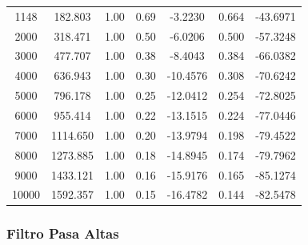 \documentclass{article}
\begin{document}
\begin{table}[H]
\begin{tabular}{ccccccc}
1148  & 182.803  & 1.00 & 0.69 &  -3.2230 & 0.664 & -43.6971 \\
2000  & 318.471  & 1.00 & 0.50 &  -6.0206 & 0.500 & -57.3248 \\
3000  & 477.707  & 1.00 & 0.38 &  -8.4043 & 0.384 & -66.0382 \\
4000  & 636.943  & 1.00 & 0.30 & -10.4576 & 0.308 & -70.6242 \\
5000  & 796.178  & 1.00 & 0.25 & -12.0412 & 0.254 & -72.8025 \\
6000  & 955.414  & 1.00 & 0.22 & -13.1515 & 0.224 & -77.0446 \\
7000  & 1114.650 & 1.00 & 0.20 & -13.9794 & 0.198 & -79.4522 \\
8000  & 1273.885 & 1.00 & 0.18 & -14.8945 & 0.174 & -79.7962 \\
9000  & 1433.121 & 1.00 & 0.16 & -15.9176 & 0.165 & -85.1274 \\
10000 & 1592.357 & 1.00 & 0.15 & -16.4782 & 0.144 & -82.5478 \\

\bottomrule
\end{tabular}

\end{table}

\subsubsection{Filtro Pasa Altas}
\end{document}
